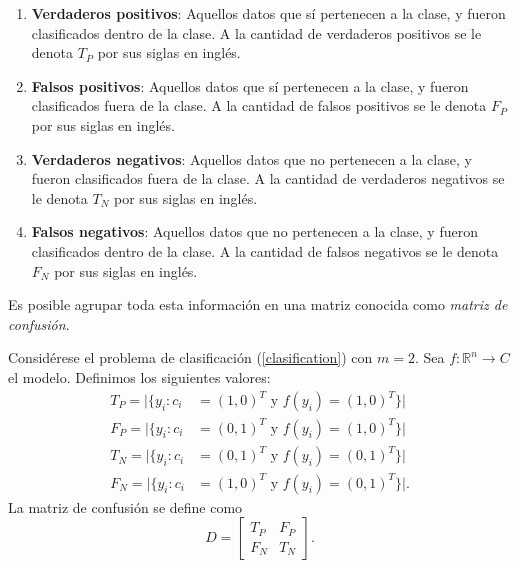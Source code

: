 \begin{enumerate}
    \item \textbf{Verdaderos positivos}: Aquellos datos que sí pertenecen a la clase, y fueron clasificados dentro de la clase. A la cantidad de verdaderos positivos se le denota $T_P$ por sus siglas en inglés.
    \item \textbf{Falsos positivos}: Aquellos datos que sí pertenecen a la clase, y fueron clasificados fuera de la clase. A la cantidad de falsos positivos se le denota $F_P$ por sus siglas en inglés.
    \item \textbf{Verdaderos negativos}: Aquellos datos que no pertenecen a la clase, y fueron clasificados fuera de la clase. A la cantidad de verdaderos negativos se le denota $T_N$ por sus siglas en inglés.
    \item \textbf{Falsos negativos}: Aquellos datos que no pertenecen a la clase, y fueron clasificados dentro de la clase. A la cantidad de falsos negativos se le denota $F_N$ por sus siglas en inglés.
\end{enumerate}
Es posible agrupar toda esta información en una matriz conocida como \textsl{matriz de confusión}. 
\begin{definition}
    \label{pos_neg}
    Considérese el problema de clasificación (\ref{clasification}) con $m = 2$. Sea $f: \mathbb R^n \to C$ el modelo. Definimos los siguientes valores:
    \begin{align*}
        T_P = |\{y_i : c_i &= (1,0)^T \text{ y } f(y_i) = (1,0)^T\}| \\
        F_P = |\{y_i : c_i &= (0,1)^T \text{ y } f(y_i) = (1,0)^T\}| \\
        T_N = |\{y_i : c_i &= (0,1)^T \text{ y } f(y_i) = (0,1)^T\}| \\
        F_N = |\{y_i : c_i &= (1,0)^T \text{ y } f(y_i) = (0,1)^T\}|.
    \end{align*} 
    La matriz de confusión se define como 
    \begin{equation}
        D = \left[\begin{matrix}
            T_P & F_P \\
            F_N & T_N
        \end{matrix}\right].
    \end{equation}
\end{definition}
